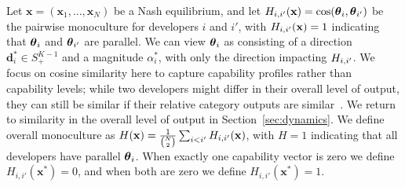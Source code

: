 Let $\mathbf{x} = (\mathbf{x}_1,\ldots,\mathbf{x}_{N})$ be a Nash equilibrium, and let $H_{i,i'}(\mathbf{x}) = \cos(\boldsymbol{\theta}_i,\boldsymbol{\theta}_{i'})$ be the pairwise monoculture for developers $i$ and $i'$, with $H_{i,i'}(\mathbf{x})= 1$ indicating that $\boldsymbol{\theta}_i$ and $\boldsymbol{\theta}_{i'}$ are parallel. 
We can view $\boldsymbol{\theta}_i$ as consisting of a direction $\mathbf{d}^*_i \in S_{+}^{K-1}$ and a magnitude $\alpha^*_{i}$, with only the direction impacting $H_{i,i'}$. 
We focus on cosine similarity here to capture capability profiles rather than capability levels; while two developers might differ in their overall level of output, they can still be similar if their relative category outputs are similar~\citep{monoculture_outcome}. 
We return to similarity in the overall level of output in Section~\ref{sec:dynamics}. 
We define overall monoculture as $H(\mathbf{x}) = \frac{1}{{N \choose 2}} \sum_{i<i'} H_{i,i'}(\mathbf{x})$, with $H=1$ indicating that all developers have parallel $\boldsymbol{\theta}_i$. 
When exactly one capability vector is zero we define $H_{i,i'}(\mathbf{x}^*)=0$, and when both are zero we define $H_{i,i'}(\mathbf{x}^*)=1$.